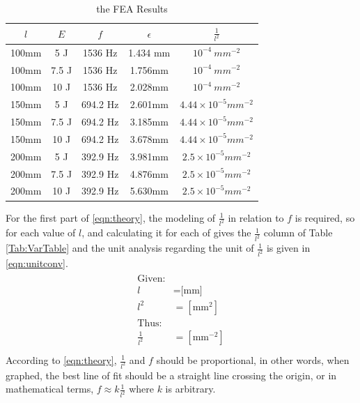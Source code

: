 \documentclass[a4paper,12pt]{article}
\begin{document}
    \begin{table}[H]%
    \begin{center}
    \begin{tabular}[H]{|c|c||c|c||c|}
    \hline
    $l$ & $E$ & $f$ & $\epsilon$ & $\frac{1}{l^{2}}$\\
    \hline\hline
    100mm & 5 J & 1536 Hz & 1.434 mm & $10^{-4}~mm^{-2}$\\
    \hline
    100mm & 7.5 J & 1536 Hz & 1.756mm & $10^{-4}~mm^{-2}$ \\
    \hline
    100mm & 10 J & 1536 Hz & 2.028mm & $10^{-4}~mm^{-2}$\\
    \hline
    150mm & 5 J & 694.2 Hz & 2.601mm & $4.44\times10^{-5}mm^{-2}$\\
    \hline
    150mm & 7.5 J & 694.2 Hz & 3.185mm & $4.44\times10^{-5}mm^{-2}$\\
    \hline
    150mm & 10 J & 694.2 Hz & 3.678mm & $4.44\times10^{-5}mm^{-2}$\\
    \hline
    200mm & 5 J & 392.9 Hz & 3.981mm & $2.5\times10^{-5}mm^{-2}$\\
    \hline
    200mm & 7.5 J & 392.9 Hz & 4.876mm & $2.5\times10^{-5}mm^{-2}$\\
    \hline
    200mm & 10 J & 392.9 Hz & 5.630mm & $2.5\times10^{-5}mm^{-2}$\\
    \hline
    \end{tabular}
    \end{center}
    \caption{the FEA Results}\label{Tab:FEAtable}
    \end{table}
    For the first part of \eqref{eqn:theory}, the modeling of $\frac{1}{l^{2}}$ in relation to $f$ is required, so for each value of $l$, and calculating it for each of gives the $\frac{1}{l^{2}}$ column of Table \ref{Tab:VarTable} and the unit analysis regarding the unit of $\frac{1}{l^{2}}$ is given in \eqref{eqn:unitconv}.
    \begin{align}%
    \label{eqn:unitconv}
    \begin{split}
    \text{Given:}\\
    l&=\text{[mm]}\\
    l^{2}&=[\text{mm}^{2}]\\
    \text{Thus:}\\
    \frac{1}{l^{2}}&=[\text{mm}^{-2}]\\
    \end{split}
    \end{align}
    According to \eqref{eqn:theory}, $\frac{1}{l^{2}}$ and $f$ should be proportional, in other words, when graphed, the best line of fit should be a straight line crossing the origin, or in mathematical terms, $f \approx k \frac{1}{l^{2}}$ where $k$ is arbitrary.
\end{document}
